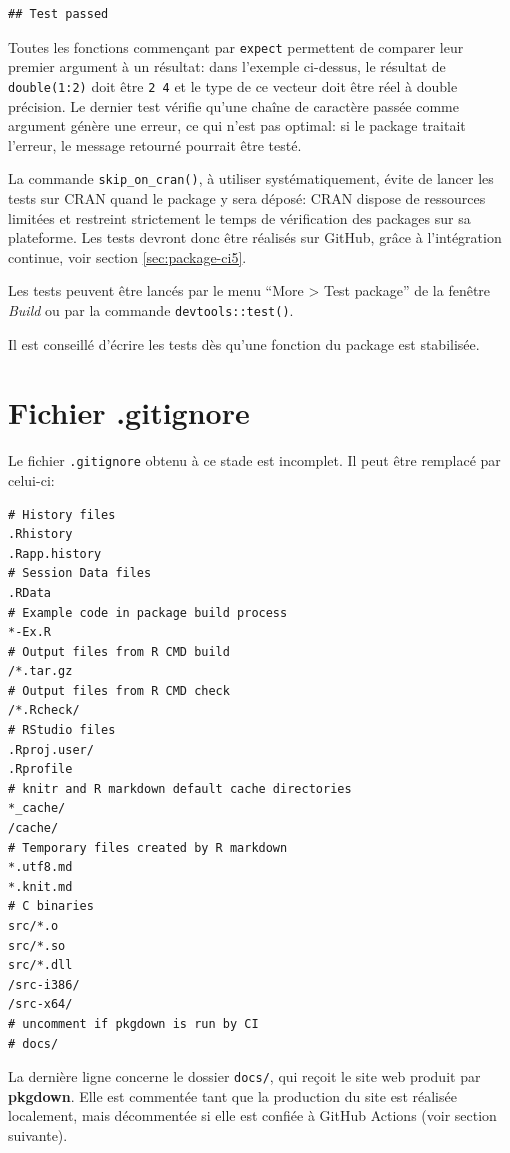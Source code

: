 \documentclass[
  12pt,
  french,
  a4paper,
  extrafontsizes,onecolumn,openright
  ]{memoir}
\begin{document}
\begin{verbatim}
## Test passed
\end{verbatim}

\normalsize

Toutes les fonctions commençant par \texttt{expect} permettent de comparer leur premier argument à un résultat: dans l'exemple ci-dessus, le résultat de \texttt{double(1:2)} doit être \texttt{2\ 4} et le type de ce vecteur doit être réel à double précision.
Le dernier test vérifie qu'une chaîne de caractère passée comme argument génère une erreur, ce qui n'est pas optimal: si le package traitait l'erreur, le message retourné pourrait être testé.

La commande \texttt{skip\_on\_cran()}, à utiliser systématiquement, évite de lancer les tests sur CRAN quand le package y sera déposé: CRAN dispose de ressources limitées et restreint strictement le temps de vérification des packages sur sa plateforme.
Les tests devront donc être réalisés sur GitHub, grâce à l'intégration continue, voir section \ref{sec:package-ci5}.

Les tests peuvent être lancés par le menu \enquote{More \textgreater{} Test package} de la fenêtre \emph{Build} ou par la commande \texttt{devtools::test()}.

Il est conseillé d'écrire les tests dès qu'une fonction du package est stabilisée.

\hypertarget{fichier-.gitignore}{%
\section{Fichier .gitignore}\label{fichier-.gitignore}}

Le fichier \texttt{.gitignore} obtenu à ce stade est incomplet.
Il peut être remplacé par celui-ci:

\begin{verbatim}
# History files
.Rhistory
.Rapp.history
# Session Data files
.RData
# Example code in package build process
*-Ex.R
# Output files from R CMD build
/*.tar.gz
# Output files from R CMD check
/*.Rcheck/
# RStudio files
.Rproj.user/
.Rprofile
# knitr and R markdown default cache directories
*_cache/
/cache/
# Temporary files created by R markdown
*.utf8.md
*.knit.md
# C binaries
src/*.o
src/*.so
src/*.dll
/src-i386/
/src-x64/
# uncomment if pkgdown is run by CI
# docs/
\end{verbatim}

La dernière ligne concerne le dossier \texttt{docs/}, qui reçoit le site web produit par \textbf{pkgdown}.
Elle est commentée tant que la production du site est réalisée localement, mais décommentée si elle est confiée à GitHub Actions (voir section suivante).
\end{document}
